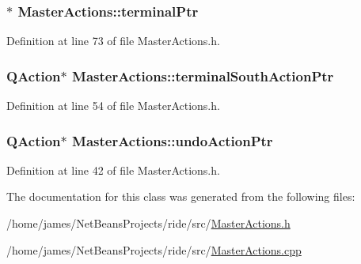 \hypertarget{class_master_actions_accb886e749ad46cb6373187e59921bcf}{
\subsubsection[{terminal\-Ptr}]{$\ast$ Master\-Actions\-::terminal\-Ptr\hspace{0.3cm}{\ttfamily [private]}}}\label{class_master_actions_accb886e749ad46cb6373187e59921bcf}


Definition at line 73 of file Master\-Actions.\-h.

\hypertarget{class_master_actions_ad96c9f17230e162e9a9f39a867101a53}{
\subsubsection[{terminal\-South\-Action\-Ptr}]{\setlength{\rightskip}{0pt plus 5cm}Q\-Action$\ast$ Master\-Actions\-::terminal\-South\-Action\-Ptr\hspace{0.3cm}{\ttfamily [private]}}}\label{class_master_actions_ad96c9f17230e162e9a9f39a867101a53}


Definition at line 54 of file Master\-Actions.\-h.

\hypertarget{class_master_actions_a23386959a2f60a89cc6ae1bff012c76c}{
\subsubsection[{undo\-Action\-Ptr}]{\setlength{\rightskip}{0pt plus 5cm}Q\-Action$\ast$ Master\-Actions\-::undo\-Action\-Ptr\hspace{0.3cm}{\ttfamily [private]}}}\label{class_master_actions_a23386959a2f60a89cc6ae1bff012c76c}


Definition at line 42 of file Master\-Actions.\-h.



The documentation for this class was generated from the following files\-:\begin{DoxyCompactItemize}
\item 
/home/james/\-Net\-Beans\-Projects/ride/src/\hyperlink{_master_actions_8h}{Master\-Actions.\-h}\item 
/home/james/\-Net\-Beans\-Projects/ride/src/\hyperlink{_master_actions_8cpp}{Master\-Actions.\-cpp}\end{DoxyCompactItemize}
